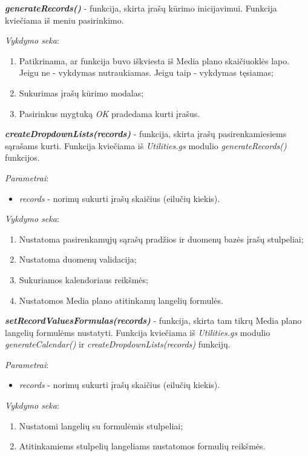 \bigskip
\textit{\textbf{generateRecords()}} - funkcija, skirta įrašų kūrimo inicijavimui. Funkcija kviečiama iš meniu pasirinkimo.

\bigskip
\textit{Vykdymo seka}:
\begin{enumerate}
    \itemsep0em 
    \item Patikrinama, ar funkcija buvo iškviesta iš Media plano skaičiuoklės lapo. Jeigu ne - vykdymas nutraukiamas. Jeigu taip - vykdymas tęsiamas;
    \item Sukurimas įrašų kūrimo modalas;
    \item Pasirinkus mygtuką \textit{OK} pradedama kurti įrašus.
\end{enumerate}

\bigskip
\textit{\textbf{createDropdownLists(records)}} - funkcija, skirta įrašų pasirenkamiesiems sąrašams kurti. Funkcija kviečiama iš \textit{Utilities.gs} modulio \textit{generateRecords()} funkcijos.

\bigskip
\textit{Parametrai}:
\begin{itemize}
    \itemsep0em 
    \item \textit{records} - norimų sukurti įrašų skaičius (eilučių kiekis).
\end{itemize}

\bigskip
\textit{Vykdymo seka}:
\begin{enumerate}
    \itemsep0em 
    \item Nustatoma pasirenkamųjų sąrašų pradžios ir duomenų bazės įrašų stulpeliai;
    \item Nustatoma duomenų validacija;
    \item Sukuriamos kalendoriaus reikšmės;
    \item Nustatomos Media plano atitinkamų langelių formulės.
\end{enumerate}

\bigskip
\textit{\textbf{setRecordValuesFormulas(records)}} - funkcija, skirta tam tikrų Media plano langelių formulėms nustatyti. Funkcija kviečiama iš \textit{Utilities.gs} modulio \textit{generateCalendar()} ir \textit{createDropdownLists(records)} funkcijų.

\bigskip
\textit{Parametrai}:
\begin{itemize}
    \itemsep0em 
    \item \textit{records} - norimų sukurti įrašų skaičius (eilučių kiekis).
\end{itemize}

\bigskip
\textit{Vykdymo seka}:
\begin{enumerate}
    \itemsep0em 
    \item Nustatomi langelių su formulėmis stulpeliai;
    \item Atitinkamiems stulpelių langeliams nustatomos formulių reikšmės.
\end{enumerate}

